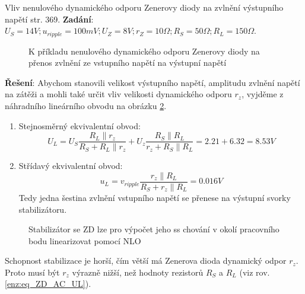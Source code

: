         \begin{example} Vliv nenulového dynamického odporu Zenerovy diody na zvlnění výstupního napětí \cite{PAEE} str. 369.
         \newline
         \textbf{Zadání}: $U_S = 14 V; u_{ripple} = 100 mV; U_Z = 8 V; r_Z = 10 \Omega; R_S = 50 \Omega; R_L = 150 \Omega$.
         \begin{figure}[ht!]
           \centering
           \caption[ Vliv $r_z$ ZD na přenos zvlnění]{K příkladu nenulového dynamického odporu Zenerovy diody na přenos zvlnění ze vstupního napětí na výstupní napětí}
           \label{enz:fig_ZD_ripple}
         \end{figure}
         \newline
         \textbf{Řešení}: Abychom stanovili velikost výstupního napětí, amplitudu zvlnění napětí na zátěži a mohli také určit vliv velikosti dynamického odporu $r_z$, vyjděme z náhradního lineárního obvodu na obrázku \ref{enz:fig_ZD_NLO}.
         \begin{enumerate}
           \item Stejnosměrný ekvivalentní obvod:
             \begin{equation}\label{enz:eq_ZD_DC_UL}
                U_L = U_S\frac{R_L\parallel r_z}{R_S + R_L\parallel r_z} + U_z\frac{R_S\parallel R_L}{r_z + R_S\parallel R_L}= 2.21 + 6.32 = 8.53V
             \end{equation}
           \item Střídavý ekvivalentní obvod:
             \begin{equation}\label{enz:eq_ZD_AC_UL}
                u_L = v_{ripple}\frac{r_z\parallel R_L}{R_S + r_z\parallel R_L} = 0.016V
             \end{equation}
             Tedy jedna šestina zvlnění vstupního napětí se přenese na výstupní svorky stabilizátoru.
         \end{enumerate}
         \begin{figure}[ht!]
           \centering
           \caption{Stabilizátor se ZD lze pro výpočet jeho ss chování v okolí pracovního bodu linearizovat pomocí NLO }
           \label{enz:fig_ZD_NLO}
         \end{figure}
         Schopnost stabilizace je horší, čím větší má Zenerova dioda dynamický odpor $r_z$. Proto musí být $r_z$ výrazně nižší, než hodnoty rezistorů $R_S$ a $R_L$ (viz rov. \ref{enz:eq_ZD_AC_UL}).
        \end{example}

